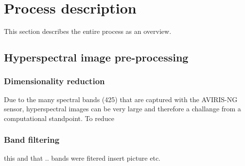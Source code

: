 
\section{Process description}

This section describes the entire process as an overview.

\subsection{Hyperspectral image pre-processing}

\subsubsection{Dimensionality reduction}

Due to the many spectral bands (425) that are captured with the AVIRIS-NG sensor, hyperspectral images can be very large and therefore a challange from a computational standpoint. To reduce

\subsubsection{Band filtering}
this and that .. bands were fitered 
insert picture etc.
